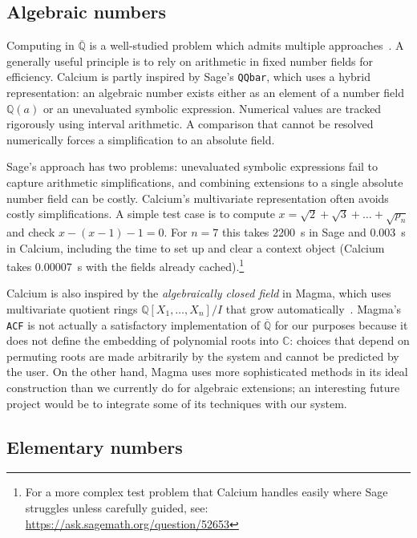 \documentclass[sigconf,screen,urlbreakonhyphens]{acmart}
\begin{document}
\subsection{Algebraic numbers}

Computing in $\overline{\mathbb{Q}}$ is a well-studied problem
which admits multiple approaches~\cite{Coh1996,Yu2010}.
A generally useful principle is to rely on arithmetic
in fixed number fields for efficiency.
Calcium is partly inspired by
Sage's \texttt{QQbar}, which uses a hybrid representation:
an algebraic number exists either as an
element of a number field $\mathbb{Q}(a)$ or
an unevaluated symbolic expression.
Numerical values are tracked rigorously using interval arithmetic.
A comparison that cannot be resolved numerically
forces a simplification to an absolute field.

Sage's approach has two problems: unevaluated symbolic
expressions fail to capture arithmetic simplifications,
and combining extensions to a single
absolute number field can be costly.
Calcium's multivariate representation often avoids
costly simplifications.
A simple test case is to compute $x = \sqrt{2} + \sqrt{3} + \ldots + \sqrt{p_n}$
and check $x-(x-1)-1 = 0$.
For $n = 7$ this takes 2200~s in Sage and 0.003~s in Calcium, including the
time to set up and clear a context object (Calcium takes 0.00007~s with the fields already cached).\footnote{For a more complex test problem that Calcium handles easily
where Sage struggles unless carefully guided, see: \url{https://ask.sagemath.org/question/52653}}

Calcium is also inspired by the \emph{algebraically closed field}
in Magma,
which uses multivariate quotient rings
$\mathbb{Q}[X_1,\ldots,X_n] / I$
that grow automatically~\cite{Ste2002,Ste2010}.
Magma's \texttt{ACF} is not actually a satisfactory implementation of $\overline{\mathbb{Q}}$
for our purposes
because it does not define the embedding of polynomial roots into $\mathbb{C}$:
choices that depend on permuting roots are made arbitrarily by the system
and cannot be predicted by the user.
On the other hand, Magma uses more sophisticated methods
in its ideal construction than we currently do for algebraic extensions; an interesting
future project would be to integrate some of its techniques with our system.

\subsection{Elementary numbers}
\end{document}

